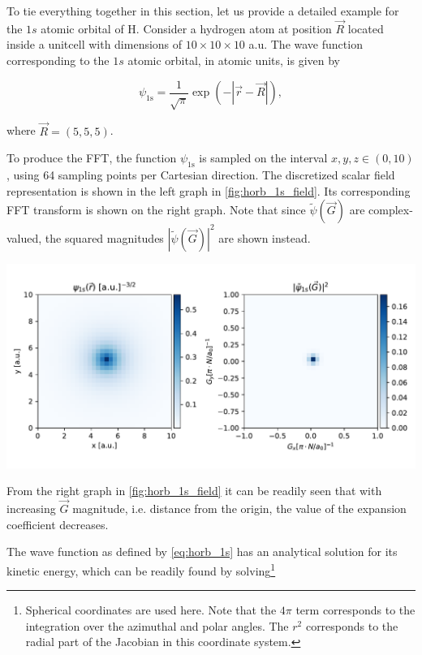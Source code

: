 To tie everything together in this section, let us provide a detailed example for the $1s$ atomic orbital of H. Consider a hydrogen atom at position $\vec{R}$ located inside a unitcell with dimensions of $10 \times 10 \times 10$ a.u. The wave function corresponding to the $1s$ atomic orbital, in atomic units, is given by

\begin{equation}
    \psi_{\text{1s}} = \frac{1}{\sqrt{\pi}} \exp \left( -|\vec{r} - \vec{R}| \right),
    \label{eq:horb_1s}
\end{equation}

where $\vec{R} = (5,5,5)$.

To produce the FFT, the function $\psi_{\text{1s}}$ is sampled on the interval $x,y,z \in (0,10)$, using 64 sampling points per Cartesian direction. The discretized scalar field representation is shown in the left graph in \cref{fig:horb_1s_field}. Its corresponding FFT transform is shown on the right graph. Note that since $\tilde{\psi}(\vec{G})$ are complex-valued, the squared magnitudes $\left|\tilde{\psi}(\vec{G})\right|^{2}$ are shown instead.

\begin{Figure}
    \centering
    \includegraphics[width=\linewidth]{img/fig3_horb1s_fields.pdf}
    \label{fig:horb_1s_field}
\end{Figure}

From the right graph in \cref{fig:horb_1s_field} it can be readily seen that with increasing $\vec{G}$ magnitude, i.e. distance from the origin, the value of the expansion coefficient decreases.

The wave function as defined by \cref{eq:horb_1s} has an analytical solution for its kinetic energy, which can be readily found by solving\footnote{Spherical coordinates are used here. Note that the $4\pi$ term corresponds to the integration over the azimuthal and polar angles. The $r^{2}$ corresponds to the radial part of the Jacobian in this coordinate system.}

